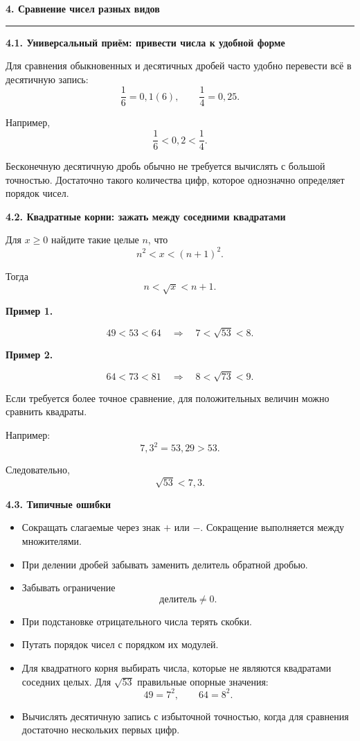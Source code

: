 \documentclass[a4paper,12pt]{article}
\newcommand{\topic}[1]{%
  \vspace{0.3em}
  {\Large\bfseries\textcolor{darkaccent}{#1}}\par
  \vspace{0.3em}
  \noindent\textcolor{accent}{\rule{\linewidth}{0.7pt}}\par
  \vspace{0.5em}
}
\newcommand{\subtopic}[1]{%
  \vspace{0.6em}
  {\large\bfseries\textcolor{darkaccent}{#1}}\par
  \vspace{0.15em}
}
\newcommand{\important}[1]{%
  \textbf{\textcolor{darkaccent}{#1}}%
}
\begin{document}

\topic{4. Сравнение чисел разных видов}

\subtopic{4.1. Универсальный приём: привести числа к удобной форме}

Для сравнения обыкновенных и десятичных дробей
часто удобно перевести всё в десятичную запись:
\[
\frac16=0{,}1(6),
\qquad
\frac14=0{,}25.
\]

Например,
\[
\frac16<0{,}2<\frac14.
\]

Бесконечную десятичную дробь обычно не требуется вычислять
с большой точностью. Достаточно такого количества цифр,
которое однозначно определяет порядок чисел.

\subtopic{4.2. Квадратные корни: зажать между соседними квадратами}

Для \(x\ge0\) найдите такие целые \(n\), что
\[
n^2<x<(n+1)^2.
\]

Тогда
\[
n<\sqrt{x}<n+1.
\]

\important{Пример 1.}
\[
49<53<64
\quad\Longrightarrow\quad
7<\sqrt{53}<8.
\]

\important{Пример 2.}
\[
64<73<81
\quad\Longrightarrow\quad
8<\sqrt{73}<9.
\]

Если требуется более точное сравнение,
для положительных величин можно сравнить квадраты.

Например:
\[
7{,}3^2=53{,}29>53.
\]

Следовательно,
\[
\sqrt{53}<7{,}3.
\]

\subtopic{4.3. Типичные ошибки}

\begin{itemize}

  \item
  Сокращать слагаемые через знак \(+\) или \(-\).
  Сокращение выполняется между множителями.

  \item
  При делении дробей забывать заменить делитель обратной дробью.

  \item
  Забывать ограничение
  \[
  \text{делитель}\ne0.
  \]

  \item
  При подстановке отрицательного числа терять скобки.

  \item
  Путать порядок чисел с порядком их модулей.

  \item
  Для квадратного корня выбирать числа,
  которые не являются квадратами соседних целых.
  Для \(\sqrt{53}\) правильные опорные значения:
  \[
  49=7^2,
  \qquad
  64=8^2.
  \]

  \item
  Вычислять десятичную запись с избыточной точностью,
  когда для сравнения достаточно нескольких первых цифр.

\end{itemize}
\end{document}
